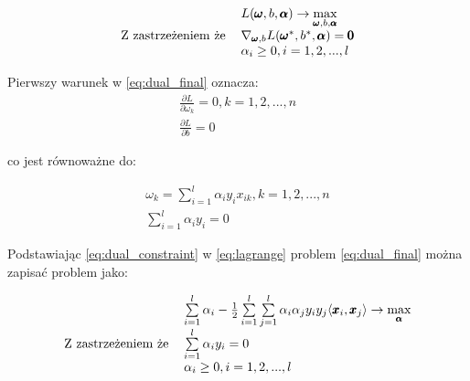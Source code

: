 \documentclass[paper=a4, fontsize=11pt]{scrartcl} %
\numberwithin{equation}{section} %
\numberwithin{figure}{section} %
\begin{document}
    \begin{equation} \label{eq:dual_final}
        \begin{tabular}{rl}
            & $L(\pmb{\omega},b,\pmb{\alpha}) \rightarrow
            \max\limits_{\pmb{\omega},b,\pmb{\alpha}}$ \\
            Z zastrzeżeniem że & $\nabla_{\pmb{\omega},b} L(\pmb{\omega}^*,b^*,\pmb{\alpha}) =
            \pmb{0}$ \\
                               & $\alpha_i \geq 0, i=1,2,...,l$
        \end{tabular}
    \end{equation}

    \par Pierwszy warunek w \ref{eq:dual_final} oznacza:
    \begin{equation}
        \begin{split}
            \frac{\partial L}{\partial \omega_k}=0,k=1,2,...,n \\
            \frac{\partial L}{\partial b}=0
        \end{split}
    \end{equation}

    co jest równoważne do:

    \begin{equation} \label{eq:dual_constraint}
        \begin{split}
            \omega_k=\sum\limits_{i=1}^{l} \alpha_i y_i x_{ik}, k=1,2,...,n \\
            \sum\limits_{i=1}^{l} \alpha_i y_i = 0
        \end{split}
    \end{equation}

    \par Podstawiając \ref{eq:dual_constraint} w \ref{eq:lagrange} problem \ref{eq:dual_final}
    można zapisać problem \label{eq:dual_final} jako:

    \begin{equation} \label{eq:dual_final_coordinate}
        \begin{tabular}{rl}
            & $\sum\limits_{i=1}^{l}\alpha_i -
            \frac{1}{2}\sum\limits_{i=1}^{l}\sum\limits_{j=1}^{l}\alpha_i\alpha_j y_i y_j
            \langle \pmb{x}_i,\pmb{x}_j \rangle \rightarrow \max\limits_{\pmb{\alpha}}$ \\
            Z zastrzeżeniem że & $\sum\limits_{i=1}^{l} \alpha_i y_i = 0$ \\
                               & $\alpha_i \geq 0, i=1,2,...,l$
        \end{tabular}
    \end{equation}
\end{document}
